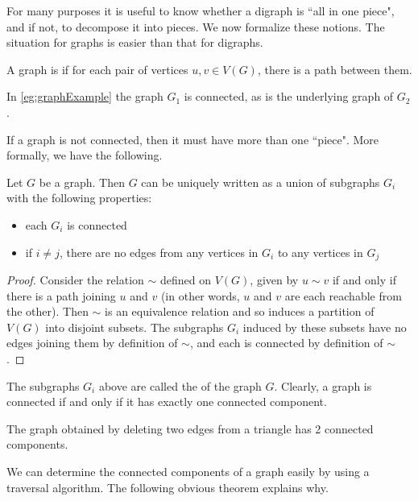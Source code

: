 For many purposes it is useful to know whether a digraph is ``all in one
piece", and if not, to decompose it into pieces. We now formalize these
notions. The situation for graphs is easier than that for digraphs.

\begin{Definition} 
A graph is  if for each pair of 
vertices $u, v\in V(G)$, there is a path between them.
\end{Definition}

In \cref{eg:graphExample} the graph $G_1$ is connected, as is the
underlying graph of $G_2$. 

If a graph is not connected, then it must have more than one ``piece".
More formally, we have the following.

\begin{Theorem}
\label{thm:components}
Let $G$ be a graph. Then $G$ can be uniquely written as a union of
subgraphs $G_i$ with the following properties:
\begin{itemize}
\item each $G_i$ is connected
\item if $i\neq j$, there are no edges from any vertices in $G_i$ 
to any vertices in $G_j$
\end{itemize}
\end{Theorem}

\begin{proof}
Consider the relation $\sim$ defined on $V(G)$, given by $u\sim v$ if
and only if there is a path joining $u$ and $v$ (in other words, $u$ and
$v$ are each reachable from the other). Then $\sim$ is an equivalence
relation and so induces a partition of $V(G)$ into disjoint subsets. The
subgraphs $G_i$ induced by these subsets have no edges joining them by
definition of $\sim$, and each is connected by definition of $\sim$.
\end{proof}

The subgraphs $G_i$ above are called the 
of the graph $G$. Clearly, a graph is connected if and only if it has
exactly one connected component.

\begin{Example}
\label{eg:components}
The graph obtained by deleting two edges from a triangle has 2 connected 
components.
\end{Example}

We can determine the connected components of a graph easily by using a
traversal algorithm. The following obvious theorem explains why.

